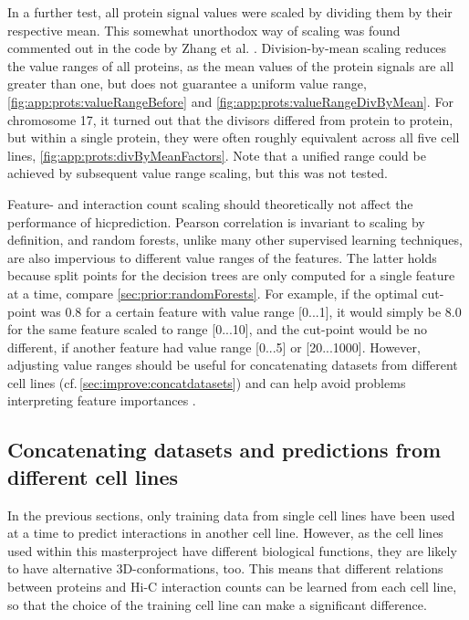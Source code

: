 In a further test, all protein signal values were scaled by dividing them by their respective mean.
This somewhat unorthodox way of scaling was found commented out in the code by Zhang et al. \cite{Roy2020}.
Division-by-mean scaling reduces the value ranges of all proteins, 
as the mean values of the protein signals are all greater than one,
but does not guarantee a uniform value range, 
\autoref{fig:app:prots:valueRangeBefore} and \ref{fig:app:prots:valueRangeDivByMean}.
For chromosome 17, it turned out that the divisors differed from protein to protein, 
but within a single protein, they were often roughly equivalent across all five cell lines, \autoref{fig:app:prots:divByMeanFactors}.
Note that a unified range could be achieved by subsequent value range scaling, but this was not tested.

Feature- and interaction count scaling should theoretically not affect the performance of hicprediction.
Pearson correlation is invariant to scaling by definition,
and random forests, unlike many other supervised learning techniques, are also impervious to different value ranges of the features.
The latter holds because split points for the decision trees are only computed for a single feature at a time, 
compare \autoref{sec:prior:randomForests}.
For example, if the optimal cut-point was 0.8 for a certain feature with value range [0...1],
it would simply be 8.0 for the same feature scaled to range [0...10], 
and the cut-point would be no different, if another feature had value range [0...5] or [20...1000].
However, adjusting value ranges should be useful
for concatenating datasets from different cell lines (cf.\,\autoref{sec:improve:concatdatasets}) and can
help avoid problems interpreting feature importances \cite{Strobl2007}.

\subsection{Concatenating datasets and predictions from different cell lines} \label{sec:improve:concatdatasets}
In the previous sections, only training data from single cell lines have been used at a time 
to predict interactions in another cell line.
However, as the cell lines used within this masterproject have different biological functions, 
they are likely to have alternative 3D-conformations, too.
This means that different relations between proteins and Hi-C interaction counts
can be learned from each cell line, so that the choice of the training cell line can make a significant difference.

